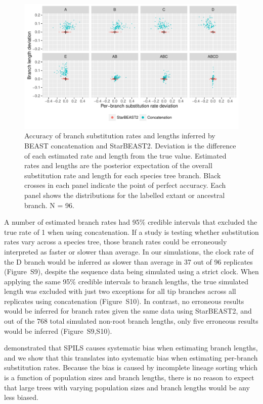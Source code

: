 \documentclass[nogrid]{MBE}%
\begin{document}
\begin{figure}[htb!]
\centering
\includegraphics[width=\textwidth]{scatter.pdf}
\caption
{Accuracy of branch substitution rates and lengths inferred by BEAST
concatenation and StarBEAST2. Deviation is the difference of each estimated
rate and length from the true value. Estimated rates and lengths are the
posterior expectation of the overall substitution rate and length for each
species tree branch. Black crosses in each panel indicate the point of perfect
accuracy. Each panel shows the distributions for the labelled extant or
ancestral branch. N = 96.}
\label{fig:spilsRates}
\end{figure}

A number of estimated branch rates had 95\% credible intervals that excluded
the true rate of 1 when using concatenation. If a study is testing whether
substitution rates vary across a species tree, those branch rates could be
erroneously interpreted as faster or slower than average. In our simulations,
the clock rate of the D branch would be inferred as slower than average in 37
out of 96 replicates (Figure~S9), despite the sequence data being simulated
using a strict clock. When applying the same 95\% credible intervals to branch
lengths, the true simulated length was excluded with just two exceptions for
all tip branches across all replicates using concatenation (Figure~S10). In
contrast, no erroneous results would be inferred for branch rates given the
same data using StarBEAST2, and out of the 768 total simulated non-root branch
lengths, only five erroneous results would be inferred (Figure~S9,S10).

\cite{Mendes01072016} demonstrated that SPILS causes systematic bias when
estimating branch lengths, and we show that this translates into systematic
bias when estimating per-branch substitution rates. Because the bias is caused
by incomplete lineage sorting which is a function of population sizes and
branch lengths, there is no reason to expect that large trees with varying
population sizes and branch lengths would be any less biased.
\end{document}
